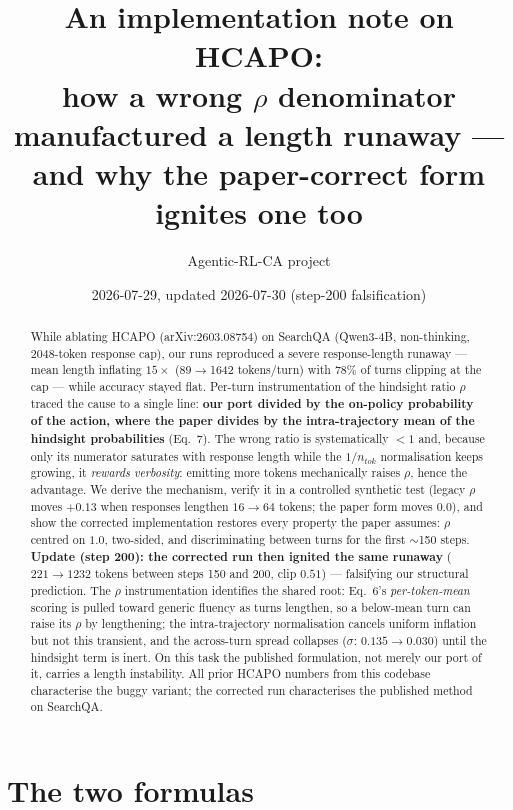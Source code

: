 \documentclass[11pt]{article}
\title{\textbf{An implementation note on HCAPO:}\\[2pt]
\large how a wrong $\rho$ denominator manufactured a length runaway ---\\
and why the paper-correct form ignites one too}
\author{Agentic-RL-CA project}
\date{2026-07-29, updated 2026-07-30 (step-200 falsification)}
\begin{document}
\maketitle

\begin{abstract}
\noindent While ablating HCAPO (arXiv:2603.08754) on SearchQA (Qwen3-4B, non-thinking, 2048-token
response cap), our runs reproduced a severe response-length runaway --- mean length inflating
$15\times$ (89$\to$1642 tokens/turn) with 78\% of turns clipping at the cap --- while accuracy stayed
flat. Per-turn instrumentation of the hindsight ratio $\rho$ traced the cause to a single line:
\textbf{our port divided by the on-policy probability of the action, where the paper divides by the
intra-trajectory mean of the hindsight probabilities} (Eq.~7). The wrong ratio is systematically
$<1$ and, because only its numerator saturates with response length while the $1/n_{tok}$
normalisation keeps growing, it \emph{rewards verbosity}: emitting more tokens mechanically raises
$\rho$, hence the advantage. We derive the mechanism, verify it in a controlled synthetic test
(legacy $\rho$ moves $+0.13$ when responses lengthen $16\to64$ tokens; the paper form moves $0.0$),
and show the corrected implementation restores every property the paper assumes: $\rho$ centred on
$1.0$, two-sided, and discriminating between turns for the first $\sim$150 steps.
\textbf{Update (step 200): the corrected run then ignited the same runaway}
($221\to1232$ tokens between steps 150 and 200, clip $0.51$) --- falsifying our structural
prediction. The $\rho$ instrumentation identifies the shared root: Eq.~6's \emph{per-token-mean}
scoring is pulled toward generic fluency as turns lengthen, so a below-mean turn can raise its
$\rho$ by lengthening; the intra-trajectory normalisation cancels uniform inflation but not this
transient, and the across-turn spread collapses ($\sigma$: $0.135\to0.030$) until the hindsight
term is inert. On this task the published formulation, not merely our port of it, carries a length
instability. All prior HCAPO numbers from this codebase characterise the buggy variant; the
corrected run characterises the published method on SearchQA.
\end{abstract}

\section{The two formulas}
\end{document}
